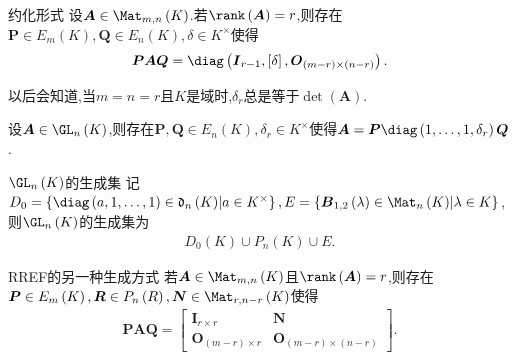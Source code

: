 \begin{proposition}{约化形式}{}
	设$\boldsymbol{A}\in\Mat_{m,n}\left(K\right)$.若$\rank\left(\boldsymbol{A}\right)=r$,则存在$\boldsymbol{P}\in E_{m}\left(K\right),\boldsymbol{Q}\in E_{n}\left(K\right),\delta\in K^{\times}$使得
	\begin{align*}
		\boldsymbol{P}\boldsymbol{A}\boldsymbol{Q}=\diag\left(\boldsymbol{I}_{r-1},\left[\delta\right],\boldsymbol{O}_{\left(m-r\right)\times\left(n-r\right)}\right).
	\end{align*}
\end{proposition}

以后会知道,当$m=n=r$且$K$是域时,$\delta_{r}$总是等于$\det\left(\boldsymbol{A}\right)$.

\begin{corollary}{}{}
	设$\boldsymbol{A}\in\GL_{n}\left(K\right)$,则存在$\boldsymbol{P},\boldsymbol{Q}\in E_{n}\left(K\right),\delta_{r}\in K^{\times}$使得$\boldsymbol{A}=\boldsymbol{P}\diag\left(1,\ldots,1,\delta_{r}\right)\boldsymbol{Q}$.
\end{corollary}

\begin{corollary}{$\GL_{n}\left(K\right)$的生成集}{}
	记$D_{0}=\left\{\diag\left(a,1,\ldots,1\right)\in\mathfrak{d}_{n}\left(K\right)\middle|a\in K^{\times}\right\},E=\left\{\boldsymbol{B}_{1,2}\left(\lambda\right)\in\Mat_{n}\left(K\right)\middle|\lambda\in K\right\}$,则$\GL_{n}\left(K\right)$的生成集为
	\begin{align*}
		D_{0}\left(K\right)\cup P_{n}\left(K\right)\cup E.
	\end{align*}
\end{corollary}

\begin{remark}{RREF的另一种生成方式}{}
	若$\boldsymbol{A}\in\Mat_{m,n}\left(K\right)$且$\rank\left(\boldsymbol{A}\right)=r$,则存在$\boldsymbol{P}\in E_{m}\left(K\right),\boldsymbol{R}\in P_{n}\left(R\right),\boldsymbol{N}\in\Mat_{r,n-r}\left(K\right)$使得
	\begin{align*}
		\boldsymbol{P}\boldsymbol{A}\boldsymbol{Q}=
		\begin{bmatrix}
			\boldsymbol{I}_{r\times r}&\boldsymbol{N}\\
			\boldsymbol{O}_{\left(m-r\right)\times r}&\boldsymbol{O}_{\left(m-r\right)\times\left(n-r\right)}
		\end{bmatrix}.
	\end{align*}
\end{remark}






